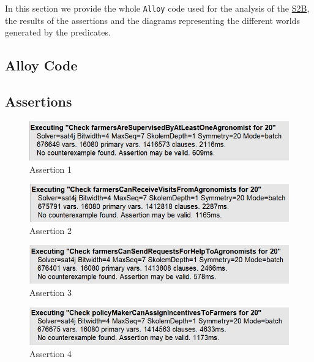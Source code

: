 In this section we provide the whole \texttt{Alloy} code used for the analysis of the \hyperref[tab:acronymsTable]{S2B}, the results of the assertions and the diagrams representing the different worlds generated by the predicates.

\subsection{Alloy Code}

\newpage


\subsection{Assertions}

\begin{figure}[H]
    \centering
    \includegraphics[]{Images/Alloy/assertion - farmersAreSupervisedByAtLeastOneAgronomist.png}
    \caption{Assertion 1}
    \label{fig:assertion1}
\end{figure}

\begin{figure}[H]
    \centering
    \includegraphics[]{Images/Alloy/assertion - farmersCanReceiveVisitsFromAgronomists.png}
    \caption{Assertion 2}
    \label{fig:assertion2}
\end{figure}

\begin{figure}[H]
    \centering
    \includegraphics[]{Images/Alloy/assertion - farmersCanSendRequestsForHelpToAgronomists.png}
    \caption{Assertion 3}
    \label{fig:assertion3}
\end{figure}

\begin{figure}[H]
    \centering
    \includegraphics[]{Images/Alloy/assertion - policyMakerCanAssignIncentivesToFarmers.png}
    \caption{Assertion 4}
    \label{fig:assertion4}
\end{figure}

